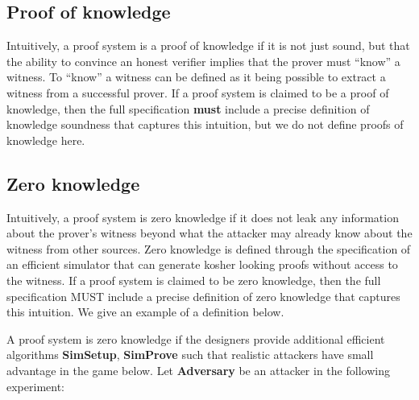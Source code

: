 \subsection{Proof of knowledge}
\label{sec:security:defs-props:proof-of-knowledge}

 Intuitively, a proof system is a proof of knowledge if it is not just sound, but that the ability to convince an honest verifier implies that the prover must “know” a witness. 
To “know” a witness can be defined as it being possible to extract a witness from a successful prover. 
If a proof system is claimed to be a proof of knowledge, then the full specification \textbf{must} include a precise definition of knowledge soundness that captures this intuition, but we do not define proofs of knowledge here.


\subsection{Zero knowledge}
\label{sec:security:defs-props:zero-knowledge}

Intuitively, a proof system is zero knowledge if it does not leak any information about the prover’s witness beyond what the attacker may already know about the witness from other sources. Zero knowledge is defined through the specification of an efficient simulator that can generate kosher looking proofs without access to the witness. 
If a proof system is claimed to be zero knowledge, then the full specification MUST include a precise definition of zero knowledge that captures this intuition. 
We give an example of a definition below.
 
A proof system is zero knowledge if the designers provide additional efficient algorithms \textbf{SimSetup}, \textbf{SimProve} such that realistic attackers have small advantage in the game below. 
Let \textbf{Adversary} be an attacker in the following experiment:

\setcounter{cntStepZKgame}{0}
\newcommand{\newStepZKgame}{\refstepcounter{cntStepZKgame}\item[\arabic{cntStepZKgame}.]}

